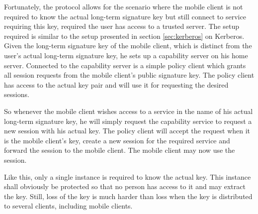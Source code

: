 Fortunately, the protocol allows for the scenario where the mobile client is not required to know the actual long-term signature key but still connect to service requiring this key, required the user has access to a trusted server.
The setup required is similar to the setup presented in section \ref{sec:kerberos} on Kerberos.
Given the long-term signature key of the mobile client, which is distinct from the user's actual long-term signature key, he sets up a capability server on his home server.
Connected to the capability server is a simple policy client which grants all session requests from the mobile client's public signature key.
The policy client has access to the actual key pair and will use it for requesting the desired sessions.

So whenever the mobile client wishes access to a service in the name of his actual long-term signature key, he will simply request the capability service to request a new session with his actual key.
The policy client will accept the request when it is the mobile client's key, create a new session for the required service and forward the session to the mobile client.
The mobile client may now use the session.

Like this, only a single instance is required to know the actual key.
This instance shall obviously be protected so that no person has access to it and may extract the key.
Still, loss of the key is much harder than loss when the key is distributed to several clients, including mobile clients.

